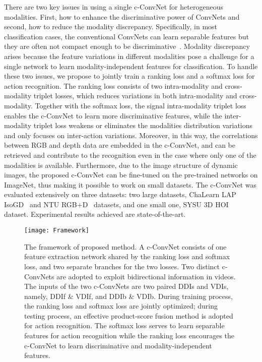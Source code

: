\documentclass[letterpaper]{article} %
\begin{document}
There are two key issues in using a single c-ConvNet for heterogeneous modalities. First, how to enhance the discriminative power of ConvNets and second, how to reduce the modality discrepancy. Specifically, in most classification cases, the conventional ConvNets can learn separable features but they are often not compact enough to be discriminative~\cite{wen2016discriminative}. Modality discrepancy arises because the feature variations in different modalities pose a challenge for a single network to learn modality-independent features for classification. To handle these two issues, we propose to jointly train a ranking loss  and a softmax loss for action recognition. The ranking loss consists of two intra-modality and cross-modality triplet losses, which reduces variations in both intra-modality and cross-modality. Together with the softmax loss, the signal intra-modality triplet loss enables the c-ConvNet to learn more discriminative features, while the inter-modality triplet loss weakens or eliminates the modalities distribution variations and only focuses on inter-action variations. Moreover, in this way, the correlations between RGB and depth data are embedded in the c-ConvNet, and can be retrieved and contribute to the recognition even in the case where only one of the modalities is available. Furthermore, due to the image structure of dynamic images, the proposed c-ConvNet can be fine-tuned on the pre-trained networks on ImageNet, thus making it possible to work on small datasets. The c-ConvNet was evaluated extensively on three datasets: two large datasets, ChaLearn LAP IsoGD~\cite{wanchalearn} and NTU RGB+D~\cite{shahroudy2016ntu} datasets, and one small one, SYSU 3D HOI~\cite{hu2015jointly} dataset. Experimental results achieved are state-of-the-art.



\begin{figure*}[t]
\begin{center}{\texttt{[image: Framework]}}
\end{center}
\caption{The framework of proposed method. A c-ConvNet consists of one feature
extraction network shared by the ranking loss and softmax loss, and
two separate branches for the two losses. Two distinct c-ConvNets are
adopted to exploit bidirectional information in videos.  The inputs of the two
c-ConvNets are two paired DDIs and VDIs, namely, DDIf \& VDIf, and DDIb \&
VDIb.  During training process, the ranking loss and softmax loss are jointly
optimized; during testing process, an effective product-score fusion method is
adopted for action recognition. The softmax loss serves to learn separable
features for action recognition while the ranking loss encourages the c-ConvNet
to learn discriminative and modality-independent features.}
\label{framework}
\end{figure*}
\end{document}
